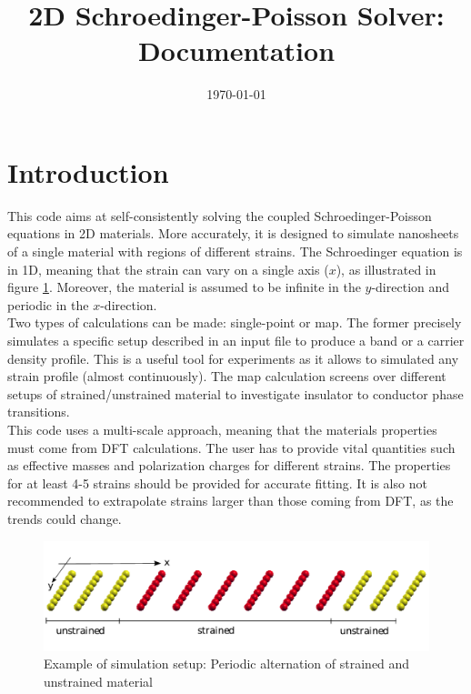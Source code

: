 \documentclass[a4paper,12pt]{article}
\begin{document}
\title{\textbf{\Huge { 2D Schroedinger-Poisson Solver: Documentation}}}
\date{\today}
\maketitle

\section{Introduction}

This code aims at self-consistently solving the coupled Schroedinger-Poisson equations in 2D materials. More accurately, it is designed to simulate nanosheets of a single material with regions of different strains. The Schroedinger equation is in 1D, meaning that the strain can vary on a single axis ($x$), as illustrated in figure \ref{fig:example1}. Moreover, the material is assumed to be infinite in the $y$-direction and periodic in the $x$-direction.\\

Two types of calculations can be made: single-point or map. The former precisely simulates a specific setup described in an input file to produce a band or a carrier density profile. This is a useful tool for experiments as it allows to simulated any strain profile (almost continuously). The map calculation screens over different setups of strained/unstrained material to investigate insulator to conductor phase transitions.\\

This code uses a multi-scale approach, meaning that the materials properties must come from DFT calculations. The user has to provide vital quantities such as effective masses and polarization charges  for different strains. The properties for at least 4-5 strains should be provided for accurate fitting. It is also not recommended to extrapolate strains larger than those coming from DFT, as the trends could change.

\begin{figure} [h]
\begin{center}
\captionsetup{width=0.8\textwidth}
\centerline{\includegraphics[width=12cm,angle=0]{img/example1}}
\caption{Example of simulation setup: Periodic alternation of strained and unstrained material}
\label{fig:example1} 
\end{center}
\end{figure}
\end{document}
